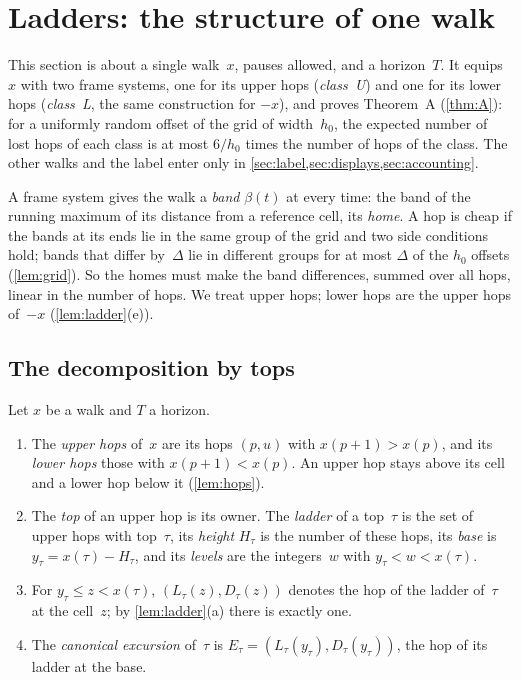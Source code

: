 \section{Ladders: the structure of one walk}\label{sec:ladders}

This section is about a single walk~$x$, pauses allowed, and a horizon~$T$. It equips $x$ with two frame systems, one for its
upper hops (\emph{class~U}) and one for its lower hops (\emph{class~L}, the same construction for $-x$), and proves Theorem~A
(\cref{thm:A}): for a uniformly random offset of the grid of width~$h_0$, the expected number of lost hops of each class is at
most $6/h_0$ times the number of hops of the class. The other walks and the label enter only in
\cref{sec:label,sec:displays,sec:accounting}.

A frame system gives the walk a \emph{band} $\beta(t)$ at every time: the band of the running maximum of its distance from a
reference cell, its \emph{home}. A hop is cheap if the bands at its ends lie in the same group of the grid and two side
conditions hold; bands that differ by~$\Delta$ lie in different groups for at most $\Delta$ of the $h_0$ offsets
(\cref{lem:grid}). So the homes must make
the band differences, summed over all hops, linear in the number of hops. We treat upper hops; lower hops are the upper hops
of~$-x$ (\cref{lem:ladder}(e)).

\subsection{The decomposition by tops}\label{sec:ladders-tops}

\begin{definition}\label{def:ladder}
Let $x$ be a walk and $T$ a horizon.
\begin{enumerate}[label=(\alph*)]
\item The \emph{upper hops} of~$x$ are its hops $(p,u)$ with $x(p+1)>x(p)$, and its \emph{lower hops} those with
$x(p+1)<x(p)$. An upper hop stays above its cell and a lower hop below it (\cref{lem:hops}).
\item The \emph{top} of an upper hop is its owner. The \emph{ladder} of a top~$\tau$ is the set of upper hops with top~$\tau$,
its \emph{height} $H_\tau$ is the number of these hops, its \emph{base} is $y_\tau=x(\tau)-H_\tau$, and its \emph{levels} are the
integers~$w$ with $y_\tau<w<x(\tau)$.
\item For $y_\tau\le z<x(\tau)$, $(L_\tau(z),D_\tau(z))$ denotes the hop of the ladder of~$\tau$ at the cell~$z$; by
\cref{lem:ladder}(a) there is exactly one.
\item The \emph{canonical excursion} of~$\tau$ is $E_\tau=(L_\tau(y_\tau),D_\tau(y_\tau))$, the hop of its ladder at the base.
\end{enumerate}
\end{definition}

